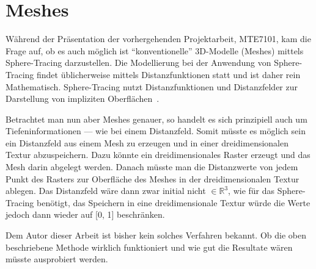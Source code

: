 
\section{Meshes}
\label{sec:rendering:meshes}

Während der Präsentation der vorhergehenden Projektarbeit, MTE7101, kam die
Frage auf, ob es auch möglich ist ``konventionelle'' 3D-Modelle (Meshes) mittels
Sphere-Tracing darzustellen. Die Modellierung bei der Anwendung von Sphere-Tracing findet 
üblicherweise mittels Distanzfunktionen statt und ist daher rein Mathematisch.
Sphere-Tracing nutzt Distanzfunktionen und Distanzfelder zur Darstellung von
impliziten Oberflächen~\cite[S. 31]{osterwalder_sven_volume_2016}.

Betrachtet man nun aber Meshes genauer, so handelt es sich prinzipiell auch um
Tiefeninformationen --- wie bei einem Distanzfeld. Somit müsste es möglich sein
ein Distanzfeld aus einem Mesh zu erzeugen und in einer dreidimensionalen
Textur abzuspeichern. Dazu könnte ein dreidimensionales Raster erzeugt und das
Mesh darin abgelegt werden. Danach müsste man die Distanzwerte von jedem Punkt
des Rasters zur Oberfläche des Meshes in der dreidimensionalen Textur ablegen.
Das Distanzfeld wäre dann zwar initial nicht $\in \mathbb{R}^{3}$, wie für das
Sphere-Tracing benötigt, das Speichern in eine dreidimensionale Textur würde
die Werte jedoch dann wieder auf [0, 1] beschränken.

Dem Autor dieser Arbeit ist bisher kein solches Verfahren bekannt. Ob die oben
beschriebene Methode wirklich funktioniert und wie gut die Resultate wären
müsste ausprobiert werden.

